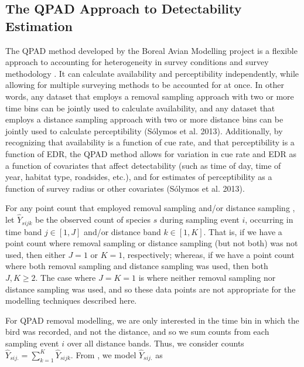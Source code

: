 \subsection{The QPAD Approach to Detectability Estimation}

\par The QPAD method developed by the Boreal Avian Modelling project is a flexible approach to accounting for heterogeneity in survey conditions and survey methodology \citep{solymos_calibrating_2013}. It can calculate availability and perceptibility independently, while allowing for multiple surveying methods to be accounted for at once. In other words, any dataset that employs a removal sampling approach with two or more time bins can be jointly used to calculate availability, and any dataset that employs a distance sampling approach with two or more distance bins can be jointly used to calculate perceptibility (Sólymos et al. 2013). Additionally, by recognizing that availability is a function of cue rate, and that perceptibility is a function of EDR, the QPAD method allows for variation in cue rate and EDR as a function of covariates that affect detectability (such as time of day, time of year, habitat type, roadsides, etc.), and for estimates of perceptibility as a function of survey radius or other covariates (Sólymos et al. 2013). 

\par For any point count that employed removal sampling \citep{alldredge_time--detection_2007, farnsworth_removal_2002} and/or distance sampling \citep{buckland_introduction_2001, buckland_distance_2015}, let $\hat{Y}_{sijk}$ be the observed count of species $s$ during sampling event $i$, occurring in time band $j \in [1,J]$ and/or distance band $k \in [1,K]$.
That is, if we have a point count where removal sampling or distance sampling (but not both) was not used, then either $J = 1$ or $K = 1$, respectively; whereas, if we have a point count where both removal sampling and distance sampling was used, then both $J,K \geq 2$.
The case where $J = K = 1$ is where neither removal sampling nor distance sampling was used, and so these data points are not appropriate for the modelling techniques described here.

\par For QPAD removal modelling, we are only interested in the time bin in which the bird was recorded, and not the distance, and so we sum counts from each sampling event $i$ over all distance bands. 
Thus, we consider counts $\hat{Y}_{sij.} = \sum_{k=1}^{K} \hat{Y}_{sijk}$. 
From \citet{solymos_calibrating_2013}, we model $\hat{Y}_{sij.}$ as

